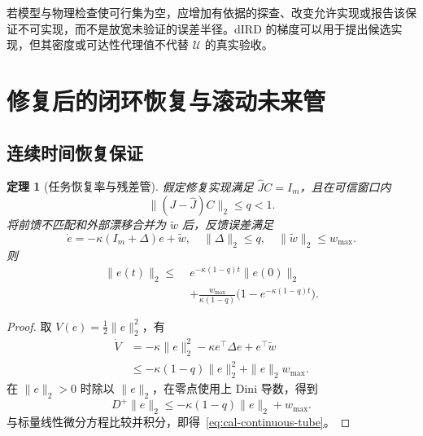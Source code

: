 \documentclass[11pt,a4paper]{article}
\numberwithin{equation}{section}
\newtheorem{theorem}{定理}[section]
\theoremstyle{definition}
\begin{document}
若模型与物理检查使可行集为空，应增加有依据的探查、改变允许实现或报告该保证不可实现，而不是放宽未验证的误差半径。dIRD 的梯度可以用于提出候选实现，但其密度或可达性代理值不代替 $\mathcal U$ 的真实验收。

\section{修复后的闭环恢复与滚动未来管}
\label{sec:cal-recovery}

\subsection{连续时间恢复保证}

\begin{theorem}[任务恢复率与残差管]
\label{thm:cal-recovery}
假定修复实现满足 $\widehat JC=I_m$，且在可信窗口内
\begin{equation}
  \|(J-\widehat J)C\|_2\le q<1 .
\end{equation}
将前馈不匹配和外部漂移合并为 $\widetilde w$ 后，反馈误差满足
\begin{equation}
  \dot e=-\kappa(I_m+\Delta)e+\widetilde w,
  \quad\|\Delta\|_2\le q,\quad
  \|\widetilde w\|_2\le w_{\max}.
  \label{eq:cal-error-dynamics}
\end{equation}
则
\begin{equation}
\begin{aligned}
  \|e(t)\|_2
  \le\;&
  e^{-\kappa(1-q)t}\|e(0)\|_2\\
  &+
  \frac{w_{\max}}{\kappa(1-q)}
  \big(1-e^{-\kappa(1-q)t}\big).
\end{aligned}
\label{eq:cal-continuous-tube}
\end{equation}
\end{theorem}

\begin{proof}
取 $V(e)=\frac12\|e\|_2^2$，有
\begin{align}
  \dot V
  &=-\kappa\|e\|_2^2
    -\kappa e^\top\Delta e
    +e^\top\widetilde w\\
  &\le
  -\kappa(1-q)\|e\|_2^2
  +\|e\|_2w_{\max}.
\end{align}
在 $\|e\|_2>0$ 时除以 $\|e\|_2$，在零点使用上 Dini 导数，得到
\begin{equation}
  D^+\|e\|_2
  \le-\kappa(1-q)\|e\|_2+w_{\max}.
\end{equation}
与标量线性微分方程比较并积分，即得~\eqref{eq:cal-continuous-tube}。
\end{proof}
\end{document}
